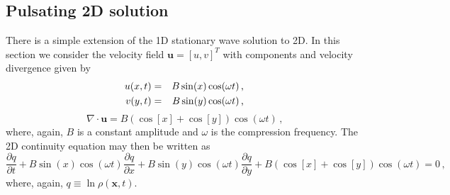 \documentclass[11pt]{book}
\begin{document}
\subsection{Pulsating 2D solution}
\label{soln_2d}

There is a simple extension of the 1D stationary wave solution to 2D. In this section we consider the velocity field $\mathbf{u}=[u,v]^T$ with components and velocity divergence given by
\begin{eqnarray}
\label{eqn_u2d}
u(x,t) &=& B \sin(x) \cos(\omega t) \,\mbox{,} \vspace{0.2cm}\\
v(y,t) &=& B \sin(y) \cos(\omega t) \,\mbox{,}
\end{eqnarray}
\begin{equation}
\label{eqn_div2d}
\nabla\cdot\mathbf{u} = B(\cos[x] + \cos[y]) \cos(\omega t) \,\mbox{,}
\end{equation}
where, again, $B$ is a constant amplitude and $\omega$ is the compression frequency.  The 2D continuity equation may then be written as
\begin{equation}
\label{eqn_cont2d}
\frac{\partial q}{\partial t} + B \sin(x) \cos(\omega t) \frac{\partial q}{\partial x} + B \sin(y) \cos(\omega t) \frac{\partial q}{\partial y} + B( \cos[x] + \cos[y]) \cos(\omega t) = 0 \,\mbox{,}
\end{equation}
where, again, $q \equiv \ln \rho(\mathbf{x},t)$.
\end{document}
